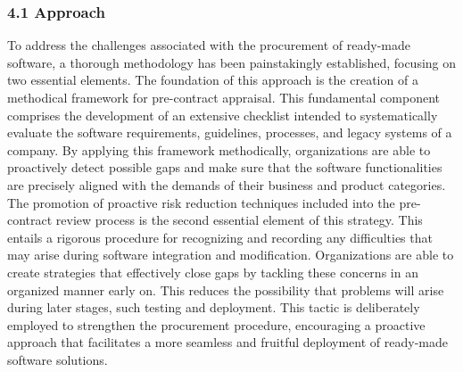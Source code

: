 \documentclass[letterpaper, 11pt]{report}
\begin{document}
\subsubsection*{4.1 Approach}
\normalsize{To address the challenges associated with the procurement of ready-made software, a thorough methodology has been painstakingly established, focusing on two essential elements. The foundation of this approach is the creation of a methodical framework for pre-contract appraisal. This fundamental component comprises the development of an extensive checklist intended to systematically evaluate the software requirements, guidelines, processes, and legacy systems of a company. By applying this framework methodically, organizations are able to proactively detect possible gaps and make sure that the software functionalities are precisely aligned with the demands of their business and product categories.\\

The promotion of proactive risk reduction techniques included into the pre-contract review process is the second essential element of this strategy. This entails a rigorous procedure for recognizing and recording any difficulties that may arise during software integration and modification. Organizations are able to create strategies that effectively close gaps by tackling these concerns in an organized manner early on. This reduces the possibility that problems will arise during later stages, such testing and deployment. This tactic is deliberately employed to strengthen the procurement procedure, encouraging a proactive approach that facilitates a more seamless and fruitful deployment of ready-made software solutions.\\
}
\end{document}
